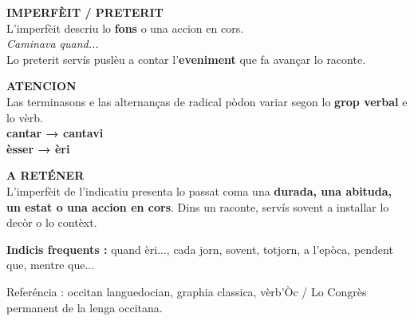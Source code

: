 \documentclass[a4paper,11pt]{article}
\begin{document}
\begin{minipage}{0.91\textwidth}
\vspace{2mm}
\begin{minipage}{0.485\textwidth}
\begin{bluebox}[height=3.25cm]
\textbf{\color{BlueDark}IMPERFÈIT / PRETERIT}\\[1mm]
L'imperfèit descriu lo \textbf{fons} o una accion en cors.\\[1mm]
\textit{Caminava quand...}\\[1mm]
Lo preterit servís puslèu a contar l'\textbf{eveniment} que fa avançar lo raconte.
\end{bluebox}
\end{minipage}\hfill
\begin{minipage}{0.485\textwidth}
\begin{warnbox}[height=3.25cm]
\textbf{\color{Red}ATENCION}\\[1mm]
Las terminasons e las alternanças de radical pòdon variar segon lo \textbf{grop verbal} e lo vèrb.\\[1mm]
\textbf{cantar → cantavi}\\
\textbf{èsser → èri}
\end{warnbox}
\end{minipage}

\vspace{2mm}
\begin{bluebox}
\textbf{\color{BlueDark}A RETÉNER}\\[1mm]
L'imperfèit de l'indicatiu presenta lo passat coma una \textbf{durada, una abituda,
un estat o una accion en cors}. Dins un raconte, servís sovent a installar lo decòr o lo contèxt.
\end{bluebox}

\vspace{1.5mm}\centering
{\small\color{Grey}\textbf{Indicis frequents :} quand èri..., cada jorn, sovent, totjorn, a l'epòca, pendent que, mentre que...}

\vspace{1mm}
{\scriptsize\color{Grey}Referéncia : occitan languedocian, graphia classica, vèrb'Òc / Lo Congrès permanent de la lenga occitana.}

\end{minipage}
\end{document}
